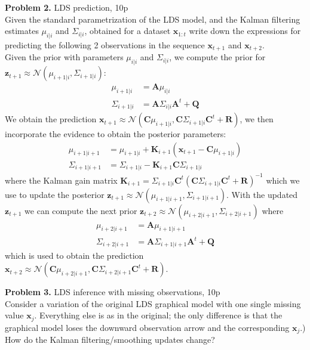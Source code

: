 \documentclass[12pt]{article}
\newcommand{\matr}[1]{\bm{#1}}     %
\newcommand{\vect}[1]{\mathbf{#1}}
\begin{document}
\noindent \textbf{Problem 2. } LDS prediction, 10p \\%
Given the standard parametrization of the LDS model, and the Kalman filtering estimates $\mu_{i|i}$ and $\Sigma_{i|i}$, obtained for a dataset $\vect{x}_{1:t}$ write down the expressions 
for predicting the following 2 observations in the sequence $\vect{x}_{t+1}$ and  $\vect{x}_{t+2}$.\\
Given the prior with parameters  $\mu_{i|i}$ and $\Sigma_{i|i}$, we compute the prior for $\vect{z}_{t + 1} \approx \mathcal{N} (\mu_{i+1|i}, \Sigma_{i+1|i})$:
\begin{align*}
	\mu_{i+1|i}	&= 	\matr{A} \mu_{i|i} \\
	\Sigma_{i+1|i}	&=	 \matr{A}  \Sigma_{i|i}  \matr{A}^t + \matr{Q}
\end{align*}
We obtain the prediction $\vect{x}_{t+1} \approx \mathcal{N} (\matr{C} \mu_{i+1|i}, \matr{C} \Sigma_{i+1|i} \matr{C}^t + \matr{R} )$, we then incorporate the evidence to obtain the posterior parameters:
\begin{align*}
	\mu_{i+1|i+1}		&= 	\mu_{i+1|i} + \matr{K}_{i+1} (\vect{x}_{t+1} - \matr{C} \mu_{i+1|i}) \\
	\Sigma_{i+1|i+1}	&=	\Sigma_{i+1|i} - \matr{K}_{i+1} 	 \matr{C}  \Sigma_{i+1|i}
\end{align*}
where the Kalman gain matrix $ \matr{K}_{i+1} = \Sigma_{i+1|i}	 \matr{C} ^t ( \matr{C} \Sigma_{i+1|i}  \matr{C} ^t + \matr{R})^{-1}$
which we use to update the posterior $\vect{z}_{t+1} \approx \mathcal{N} (\mu_{i+1|i+1},\Sigma_{i+1|i+1})$.
With the updated  $\vect{z}_{t+1}$ we can compute the next prior $\vect{z}_{t + 2} \approx \mathcal{N} (\mu_{i+2|i+1}, \Sigma_{i+2|i+1})$ where 
\begin{align*}
	\mu_{i+2|i+1}		&= 	\matr{A} \mu_{i+1|i+1} \\
	\Sigma_{i+2|i+1}	&=	 \matr{A}  \Sigma_{i+1|i+1}  \matr{A}^t + \matr{Q}
\end{align*}
which is used to obtain the prediction  $\vect{x}_{t+2} \approx \mathcal{N} (\matr{C} \mu_{i+2|i+1}, \matr{C} \Sigma_{i+2|i+1} \matr{C}^t + \matr{R} )$.
 
\noindent \textbf{Problem 3.} LDS inference with missing observations, 10p \\%
Consider a variation of the original LDS graphical model with one single missing value $\mathbf{x}_j$. Everything else is as in the original; the only difference is that the graphical model loses the downward observation arrow and the corresponding $\mathbf{x}_j$.)
How do the Kalman filtering/smoothing updates change?\\
\end{document}

